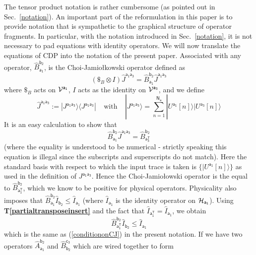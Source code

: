 \documentclass[10pt]{article}
\begin{document}
The tensor product notation is rather cumbersome (as pointed out in Sec.\ \ref{notation}).   An important part of the reformulation in this paper is to provide notation that is sympathetic to the graphical structure of operator fragments.  In particular, with the notation introduced in Sec.\ \ref{notation}, it is not necessary to pad equations with identity operators.   We will now translate the equations of CDP into the notation of the present paper.
Associated with any operator, $\hat B_\mathsf{a_1}^\mathsf{b_2}$, is the Choi-Jamio\l kowski operator defined as
\begin{equation}
(\$_B\otimes I) \hat J^\mathsf{a_1a_3} = \hat B_\mathsf{a_1}^\mathsf{b_2} \hat J^\mathsf{a_1a_3}
\end{equation}
where $\$_B $ acts on ${\cal V}^\mathsf{a_1}$, $I$ acts as the identity on ${\cal V}^\mathsf{a_3}$, and we define
\begin{equation}
\hat J^\mathsf{a_1a_3} := |J^\mathsf{a_1a_3}\rangle\langle J^\mathsf{a_1a_3}| ~~~~~\text{with}~~~~~
|J^\mathsf{a_1a_3}\rangle = \sum_{n=1}^\mathsf{N_\mathsf{a}} |U^\mathsf{a_1}[n]\rangle|U^\mathsf{a_3}[n]\rangle
\end{equation}
It is an easy calculation to show that
\begin{equation}
\hat B_\mathsf{a_1}^\mathsf{b_2} \hat J^\mathsf{a_1a_3} = \hat B_\mathsf{a^T_3}^\mathsf{b_2}
\end{equation}
(where the equality is understood to be numerical - strictly speaking this equation is illegal since the subscripts and superscripts do not match).  Here the standard basis with respect to which the input trace is taken is $\{|U^\mathsf{a_1}[n]\rangle\}$ as used in the definition of $J^\mathsf{a_1a_3}$.   Hence the Choi-Jamio\l owski operator is the equal to $\hat B_\mathsf{a^T_1}^\mathsf{b_2}$, which we know to be positive for physical operators.  Physicality also imposes that $\hat B_\mathsf{a_1}^\mathsf{b_2} \hat I_\mathsf{b_2} \leq \hat I_\mathsf{a_1}$ (where $\hat I_\mathsf{a_1}$ is the identity operator on ${\cal H}_\mathsf{a_1}$).  Using {\bf T\ref{partialtransposeinsert}} and the fact that $\hat I_\mathsf{a^T_1}=\hat I_\mathsf{a_1}$, we obtain
\begin{equation}
\hat B_\mathsf{a^T_1}^\mathsf{b_2} \hat I_\mathsf{b_2} \leq  \hat I_\mathsf{a_1}
\end{equation}
which is the same as (\ref{conditiononCJ}) in the present notation.   If we have two operators $\hat A_\mathsf{a_1}^\mathsf{b_2}$ and $\hat B_\mathsf{b_2}^\mathsf{c_3}$ which are wired together to form
\end{document}
